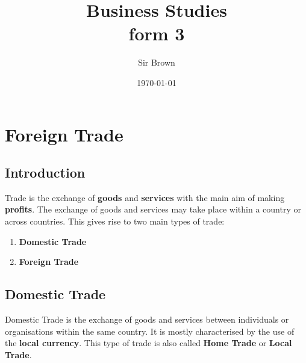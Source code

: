 \documentclass[14pt,a4paper, openany]{book}
\begin{document}
\frontmatter
\title{Business Studies \\ form 3}
\author{Sir Brown}
\date{\today}

\maketitle




\mainmatter
\chapter{Foreign Trade}

\section{Introduction}
Trade is the exchange of \textbf{goods} and \textbf{services} with the main aim of making \textbf{profits}.
The exchange of goods and services may take place within a country or across countries.
This gives rise to two main types of trade:
\begin{enumerate}
	\item \textbf{Domestic Trade}
	\item \textbf{Foreign Trade}
\end{enumerate}

\section{Domestic Trade}
Domestic Trade is the exchange of goods and services between individuals or organisations within the same country.
It is mostly characterised by the use of the \textbf{local currency}.
This type of trade is also called \textbf{Home Trade} or \textbf{Local Trade}.
\end{document}
